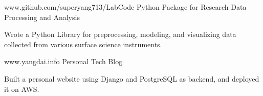 


\begin{cventries}


\cventry
{www.github.com/superyang713/LabCode}
{Python Package for Research Data Processing and Analysis}
{}
{}
{
\begin{cvitems}
\item {Wrote a Python Library for preprocessing, modeling, and visualizing data
    collected from various surface science instruments.}
\end{cvitems}
}


\cventry
{www.yangdai.info}
{Personal Tech Blog}
{}
{}
{
\begin{cvitems}
\item {Built a personal website using Django and PostgreSQL as backend, and
    deployed it on AWS.}
\end{cvitems}
}


\end{cventries}


